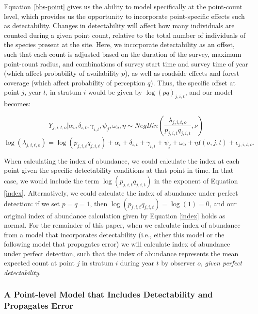 \par Equation \ref{bbs-point} gives us the ability to model specifically at the point-count level, which provides us the opportunity to incorporate point-specific effects such as detectability.
Changes in detectability will affect how many individuals are counted during a given point count, relative to the total number of individuals of the species present at the site.
Here, we incorporate detectability as an offset, such that each count is adjusted based on the duration of the survey, maximum point-count radius, and combinations of survey start time and survey time of year (which affect probability of availability $p$), as well as roadside effects and forest coverage (which affect probability of perception $q$). 
Thus, the specific offset at point $j$, year $t$, in stratum $i$ would be given by $\log(p q)_{j,i,t}$, and our model becomes:

\begin{equation*}
	Y_{j,i,t,o} | \alpha_i, \delta_{i,t}, \gamma_{i,t}, \psi_j, \omega_o, \eta \sim NegBin \left( \dfrac{\lambda_{j,i,t,o}}{p_{j,i,t}q_{j,i,t}}, \nu \right)
\end{equation*}
\begin{equation}\label{bbs-detect}
	\log(\lambda_{j,i,t,o}) = \log(p_{j,i,t}q_{j,i,t}) + \alpha_i + \delta_{i,t} + \gamma_{i,t} + \psi_j + \omega_o + \eta I(o,j,t) + \epsilon_{j,i,t,o}.
\end{equation}

\par When calculating the index of abundance, we could calculate the index at each point given the specific detectability conditions at that point in time.
In that case, we would include the term $\log(p_{j,i,t}q_{j,i,t})$ in the exponent of Equation \ref{index}.
Alternatively, we could calculate the index of abundance under perfect detection: if we set $p = q = 1$, then $\log(p_{j,i,t}q_{j,i,t}) = \log(1) = 0$, and our original index of abundance calculation given by Equation \ref{index} holds as normal.
For the remainder of this paper, when we calculate index of abundance from a model that incorporates detectability (i.e., either this model or the following model that propagates error) we will calculate index of abundance under perfect detection, such that the index of abundance represents the mean expected count at point $j$ in stratum $i$ during year $t$ by observer $o$, \textit{given perfect detectability}.

\subsubsection{A Point-level Model that Includes Detectability and Propagates Error}\label{varprop-text}

